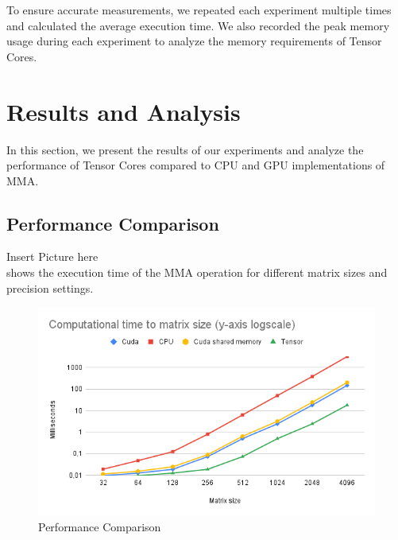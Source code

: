 \documentclass[conference]{IEEEtran}
\begin{document}
  To ensure accurate measurements, we repeated each experiment multiple times and calculated 
  the average execution time. We also recorded the peak memory usage during each experiment to 
  analyze the memory requirements of Tensor Cores.
  
  \section{Results and Analysis}\label{sec:results-analysis}
  
  In this section, we present the results of our experiments and analyze the performance of 
  Tensor Cores compared to CPU and GPU implementations of MMA.

  
  \subsection{Performance Comparison}\label{sec:performance-comparison}

  Insert Picture here\\
  shows the execution time of the MMA operation for different matrix sizes and precision settings.
  
  \begin{figure}[htbp]
    \centering
    \includegraphics[scale=0.38]{figures/Computational time to matrix size (y-axis logscale).png}
    \caption{Performance Comparison}
    \label{fig:performance-comparison}
  \end{figure}
\end{document}
